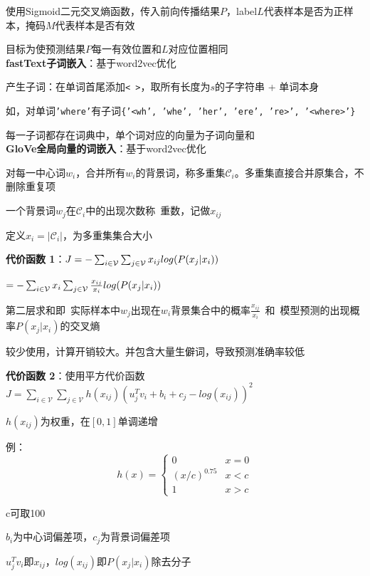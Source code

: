 \documentclass[UTF8]{ctexart}
\begin{document}
  \quad 使用Sigmoid二元交叉熵函数，传入前向传播结果$P$，label$L$代表样本是否为正样本，掩码$M$代表样本是否有效

  \quad 目标为使预测结果$P$每一有效位置和$L$对应位置相同\\
\textbf{fastText子词嵌入}：基于word2vec优化

  产生子词：在单词首尾添加\texttt{< >}，取所有长度为$s$的子字符串 + 单词本身

  \quad 如，对单词\texttt{'where'}有子词\texttt{\{'<wh', 'whe', 'her', 'ere', 're>', '<where>'\}}

  每一子词都存在词典中，单个词对应的向量为子词向量和\\
\textbf{GloVe全局向量的词嵌入}：基于word2vec优化

  对每一中心词$w_i$，合并所有$w_i$的背景词，称多重集$\mathcal{C}_i$。多重集直接合并原集合，不删除重复项

  \quad 一个背景词$w_j$在$\mathcal{C}_i$中的出现次数称\ 重数，记做$x_{ij}$

  \quad 定义$x_i = |\mathcal{C}_i|$，为多重集集合大小

  \textbf{代价函数 1}：$J = -\sum_{i\in \mathcal{V} }\sum_{j\in \mathcal{V} }x_{ij} \space log(P(x_j | x_i))$  

  \quad $= -\sum_{i\in \mathcal{V} }x_{i} \sum_{j\in \mathcal{V} } \frac{x_{ij}}{x_i}\space log(P(x_j | x_i))$

  \quad 第二层求和即\ 实际样本中$w_j$出现在$w_i$背景集合中的概率$\frac{x_{ij}}{x_i}$\ 和\ 模型预测的出现概率$P(x_j | x_i)$的交叉熵

  \quad * 较少使用，计算开销较大。并包含大量生僻词，导致预测准确率较低

  \textbf{代价函数 2}：使用平方代价函数$J = \sum_{i \in \mathcal{V}}\sum_{j \in \mathcal{V}}h(x_{ij})(u_j^Tv_i + b_i + c_j -log(x_{ij}))^2$

  \quad $h(x_{ij})$为权重，在$[0, 1]$单调递增

  \quad \quad 例：\begin{equation*}
    h(x) = \begin{cases}
    0 & x = 0\\
    (x / c)^{0.75} & x < c\\
    1 & x > c
    \end{cases}
  \end{equation*}

  \quad \quad c可取100

  \quad $b_i$为中心词偏差项，$c_j$为背景词偏差项

  \quad $u_j^Tv_i$即$x_{ij}$，$log(x_{ij})$即$P(x_j|x_i)$除去分子
  
\end{document}

